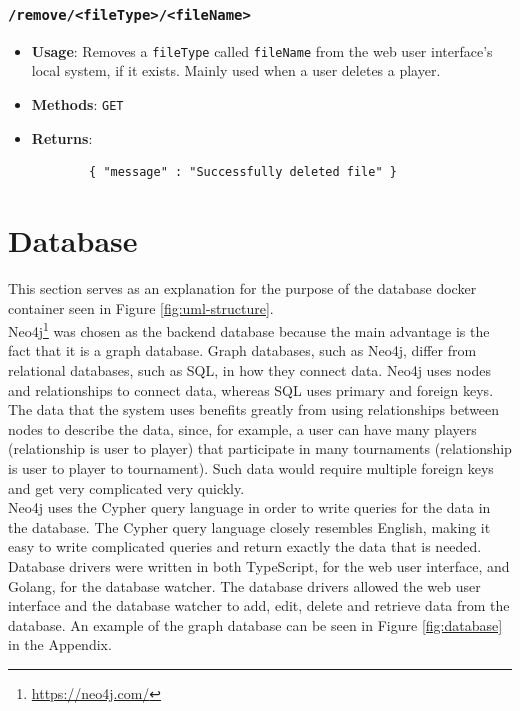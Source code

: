 \documentclass[a4paper, 11pt]{report}
\begin{document}
\subsubsection*{\texttt{/remove/<fileType>/<fileName>}}
\begin{itemize}
	\item \textbf{Usage}: Removes a \texttt{fileType} called \texttt{fileName}
	from the web user interface's local system, if it exists. Mainly used when
	a user deletes a player.
	\item \textbf{Methods}: \texttt{GET}
	\item \textbf{Returns}:
	\begin{verbatim}
		{ "message" : "Successfully deleted file" }
	\end{verbatim}
\end{itemize}

\section{Database}

This section serves as an explanation for the purpose of the database docker
container seen in Figure \ref{fig:uml-structure}. \\

Neo4j\footnote{\url{https://neo4j.com/}} was chosen as the backend database
because the main advantage is the fact that it is a graph database. Graph databases,
such as Neo4j, differ from relational databases, such as SQL, in how they connect
data. Neo4j uses nodes and relationships to connect data, whereas SQL uses
primary and foreign keys. The data that the system uses benefits greatly from
using relationships between nodes to describe the data, since, for example, a user
can have many players (relationship is user to player) that participate in many
tournaments (relationship is user to player to tournament). Such data would require
multiple foreign keys and get very complicated very quickly. \\

Neo4j uses the Cypher query language in order to write queries for the data in
the database. The Cypher query language closely resembles English, making it easy
to write complicated queries and return exactly the data that is needed. Database
drivers were written in both TypeScript, for the web user interface, and Golang,
for the database watcher. The database drivers allowed the web user interface
and the database watcher to add, edit, delete and retrieve data from the
database. An example of the graph database can be seen in Figure \ref{fig:database}
in the Appendix.
\end{document}
